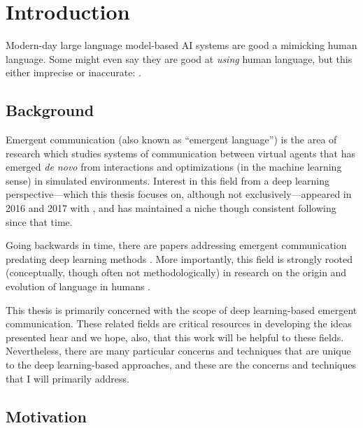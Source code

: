 \chapter{Introduction}

Modern-day large language model-based AI systems are good a mimicking human language.
Some might even say they are good at \emph{using} human language, but this either imprecise or inaccurate:
  .



\section{Background}

Emergent communication (also known as ``emergent language'') is the area of research which studies systems of communication between virtual agents that has emerged \emph{de novo} from interactions and optimizations (in the machine learning sense) in simulated environments.
Interest in this field from a deep learning perspective---which this thesis focuses on, although not exclusively---appeared in 2016 and 2017 with , and has maintained a niche though consistent following since that time.

Going backwards in time, there are papers addressing emergent communication predating deep learning methods .
More importantly, this field is strongly rooted (conceptually, though often not methodologically) in research on the origin and evolution of language in humans .

This thesis is primarily concerned with the scope of deep learning-based emergent communication.
These related fields are critical resources in developing the ideas presented hear and we hope, also, that this work will be helpful to these fields.
Nevertheless, there are many particular concerns and techniques that are unique to the deep learning-based approaches, and these are the concerns and techniques that I will primarily address.



\section{Motivation}



